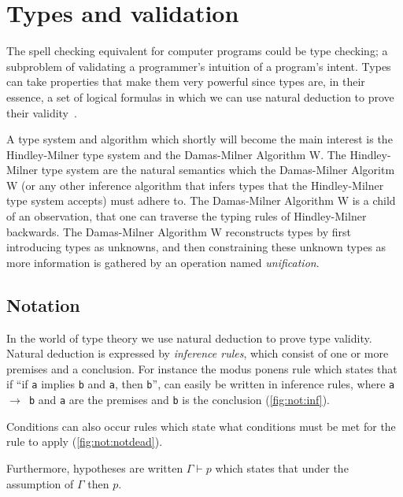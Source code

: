\section{Types and validation}
\label{sec:types}
The spell checking equivalent for computer programs could be type checking; a subproblem of validating a programmer's intuition of a program's intent.
Types can take properties that make them very powerful since types are, in their essence, a set of logical formulas in which we can use natural deduction to prove their validity~\cite{howard1980formulae}.

A type system and algorithm which shortly will become the main interest is the Hindley-Milner type system and the Damas-Milner Algorithm W.
The Hindley-Milner type system are the natural semantics which the Damas-Milner Algoritm W (or any other inference algorithm that infers types that the Hindley-Milner type system accepts) must adhere to.
The Damas-Milner Algorithm W is a child of an observation, that one can traverse the typing rules of Hindley-Milner backwards.
The Damas-Milner Algorithm W reconstructs types by first introducing types as unknowns, and then constraining these unknown types as more information is gathered by an operation named \textit{unification}.
\subsection{Notation}
In the world of type theory we use natural deduction to prove type validity.
Natural deduction is expressed by \textit{inference rules}, which consist of one or more premises and a conclusion.
For instance the modus ponens rule which states that if ``if \texttt{a} implies \texttt{b} and \texttt{a}, then \texttt{b}'', can easily be written in inference rules, where \texttt{a $\rightarrow$ b} and \texttt{a} are the premises and \texttt{b} is the conclusion (\autoref{fig:not:inf}).
\begin{figure}
  \begin{mdframed}
  \begin{prooftree}
  \end{prooftree}
  \end{mdframed}
  \caption{}
  \label{fig:not:inf}
\end{figure}
Conditions can also occur rules which state what conditions must be met for the rule to apply (\autoref{fig:not:notdead}).
\begin{figure}
  \begin{mdframed}
  \begin{prooftree}
  \end{prooftree}
  \end{mdframed}
  \caption{}
  \label{fig:not:notdead}
\end{figure}
Furthermore, hypotheses are written $\Gamma \vdash p$ which states that under the assumption of $\Gamma$ then $p$.

